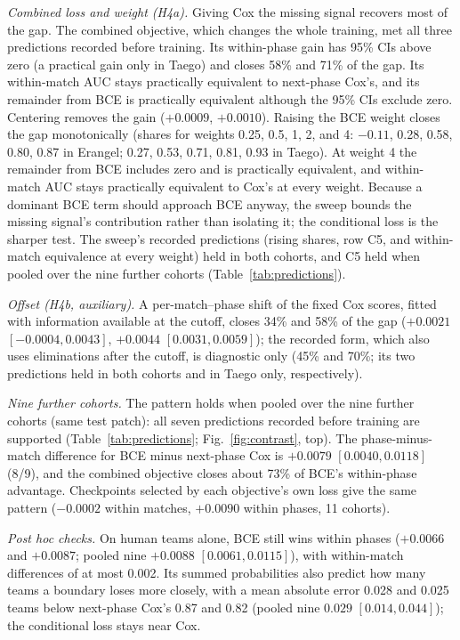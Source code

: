 \documentclass[sigconf,anonymous]{acmart}
\begin{document}
\emph{Combined loss and weight (H4a).} Giving Cox the missing signal recovers most of the gap. The combined objective, which changes the whole training, met all three predictions recorded before training. Its within-phase gain has 95\% CIs above zero (a practical gain only in Taego) and closes 58\% and 71\% of the gap. Its within-match AUC stays practically equivalent to next-phase Cox's, and its remainder from BCE is practically equivalent although the 95\% CIs exclude zero. Centering removes the gain ($+0.0009$, $+0.0010$). Raising the BCE weight closes the gap monotonically (shares for weights 0.25, 0.5, 1, 2, and 4: $-0.11$, 0.28, 0.58, 0.80, 0.87 in Erangel; 0.27, 0.53, 0.71, 0.81, 0.93 in Taego). At weight 4 the remainder from BCE includes zero and is practically equivalent, and within-match AUC stays practically equivalent to Cox's at every weight. Because a dominant BCE term should approach BCE anyway, the sweep bounds the missing signal's contribution rather than isolating it; the conditional loss is the sharper test. The sweep's recorded predictions (rising shares, row C5, and within-match equivalence at every weight) held in both cohorts, and C5 held when pooled over the nine further cohorts (Table~\ref{tab:predictions}).

\emph{Offset (H4b, auxiliary).} A per-match--phase shift of the fixed Cox scores, fitted with information available at the cutoff, closes 34\% and 58\% of the gap ($+0.0021$ $[-0.0004,\allowbreak 0.0043]$, $+0.0044$ $[0.0031,\allowbreak 0.0059]$); the recorded form, which also uses eliminations after the cutoff, is diagnostic only (45\% and 70\%; its two predictions held in both cohorts and in Taego only, respectively).


\emph{Nine further cohorts.} The pattern holds when pooled over the nine further cohorts (same test patch): all seven predictions recorded before training are supported (Table~\ref{tab:predictions}; Fig.~\ref{fig:contrast}, top). The phase-minus-match difference for BCE minus next-phase Cox is $+0.0079$ $[0.0040,\allowbreak 0.0118]$ (8/9), and the combined objective closes about 73\% of BCE's within-phase advantage. Checkpoints selected by each objective's own loss give the same pattern ($-0.0002$ within matches, $+0.0090$ within phases, 11 cohorts).

\emph{Post hoc checks.} On human teams alone, BCE still wins within phases ($+0.0066$ and $+0.0087$; pooled nine $+0.0088$ $[0.0061,\allowbreak 0.0115]$), with within-match differences of at most 0.002. Its summed probabilities also predict how many teams a boundary loses more closely, with a mean absolute error 0.028 and 0.025 teams below next-phase Cox's 0.87 and 0.82 (pooled nine $0.029$ $[0.014,\allowbreak 0.044]$); the conditional loss stays near Cox.
\end{document}
